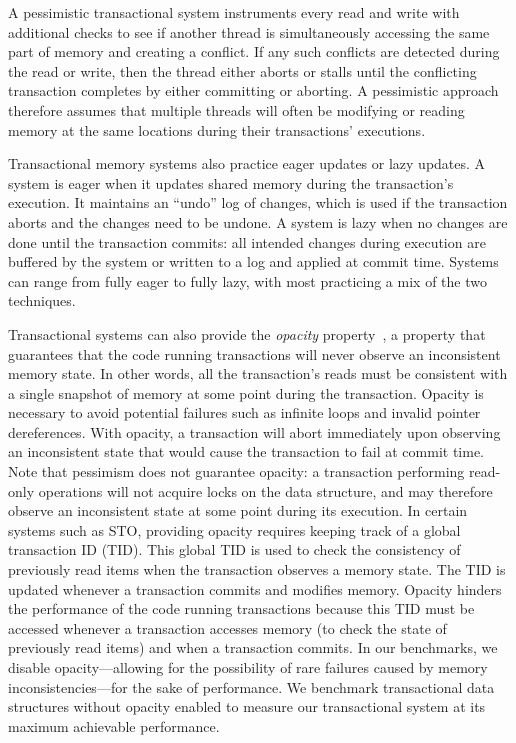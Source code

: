 A pessimistic transactional system instruments every read and write with additional checks to see if another thread is simultaneously accessing the same part of memory and creating a conflict. If any such conflicts are detected during the read or write, then the thread either aborts or stalls until the conflicting transaction completes by either committing or aborting. A pessimistic approach therefore assumes that multiple threads will often be modifying or reading memory at the same locations during their transactions' executions. 

Transactional memory systems also practice eager updates or lazy updates. A system is eager when it updates shared memory during the transaction's execution. It maintains an ``undo'' log of changes, which is used if the transaction aborts and the changes need to be undone. 
A system is lazy when no changes are done until the transaction commits: all intended changes during execution are buffered by the system or written to a log and applied at commit time. Systems can range from fully eager to fully lazy, with most practicing a mix of the two techniques.

Transactional systems can also provide the \emph{opacity} property~\cite{opacity}, a property that guarantees that the code running transactions will never observe an inconsistent memory state. 
In other words, all the transaction's reads must be consistent with a single snapshot of memory at some point during the transaction.
Opacity is necessary to avoid potential failures such as infinite loops and invalid pointer dereferences. With opacity, a transaction will abort immediately upon observing an inconsistent state that would cause the transaction to fail at commit time. Note that pessimism does not guarantee opacity: a transaction performing read-only operations will not acquire locks on the data structure, and may therefore observe an inconsistent state at some point during its execution.
In certain systems such as STO, providing opacity requires keeping track of a global transaction ID (TID). This global TID is used to check the consistency of previously read items when the transaction observes a memory state. The TID is updated whenever a transaction commits and modifies memory. Opacity hinders the performance of the code running transactions because this TID must be accessed whenever a transaction accesses memory (to check the state of previously read items) and when a transaction commits. In our benchmarks, we disable opacity---allowing for the possibility of rare failures caused by memory inconsistencies---for the sake of performance. We benchmark transactional data structures without opacity enabled to measure our transactional system at its maximum achievable performance.

